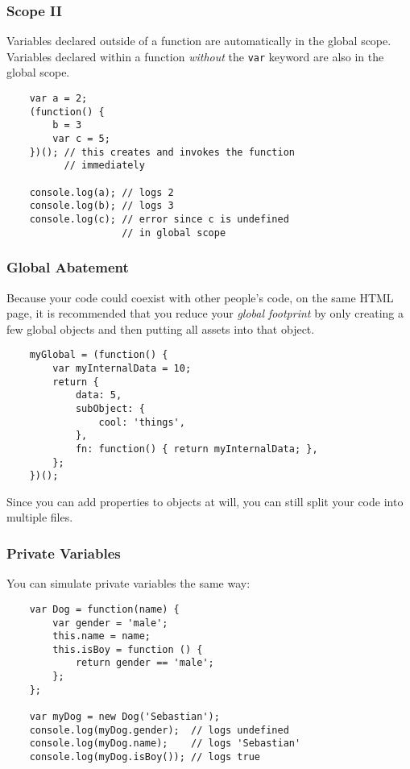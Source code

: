 \documentclass{lug}
\begin{document}
\begin{frame}[fragile]
    \frametitle{Scope II}

    Variables declared outside of a function are automatically in the global scope.\\

    Variables declared within a function \textit{without} the \texttt{var} keyword are also in the
    global scope.

    \begin{verbatim}
    var a = 2;
    (function() {
        b = 3
        var c = 5;
    })(); // this creates and invokes the function
          // immediately

    console.log(a); // logs 2
    console.log(b); // logs 3
    console.log(c); // error since c is undefined
                    // in global scope
    \end{verbatim}
\end{frame}

\begin{frame}[fragile]
    \frametitle{Global Abatement}
    Because your code could coexist with other people's code, on the same HTML page, it is
    recommended that you reduce your \textit{global footprint} by only creating a few global objects
    and then putting all assets into that object.

    \begin{verbatim}
    myGlobal = (function() {
        var myInternalData = 10;
        return {
            data: 5,
            subObject: {
                cool: 'things',
            },
            fn: function() { return myInternalData; },
        };
    })();
    \end{verbatim}

    Since you can add properties to objects at will, you can still split your code into multiple
    files.
\end{frame}

\begin{frame}[fragile]
    \frametitle{Private Variables}

    You can simulate private variables the same way:

    \begin{verbatim}
    var Dog = function(name) {
        var gender = 'male';
        this.name = name;
        this.isBoy = function () {
            return gender == 'male';
        };
    };

    var myDog = new Dog('Sebastian');
    console.log(myDog.gender);  // logs undefined
    console.log(myDog.name);    // logs 'Sebastian'
    console.log(myDog.isBoy()); // logs true
    \end{verbatim}
\end{frame}
\end{document}
